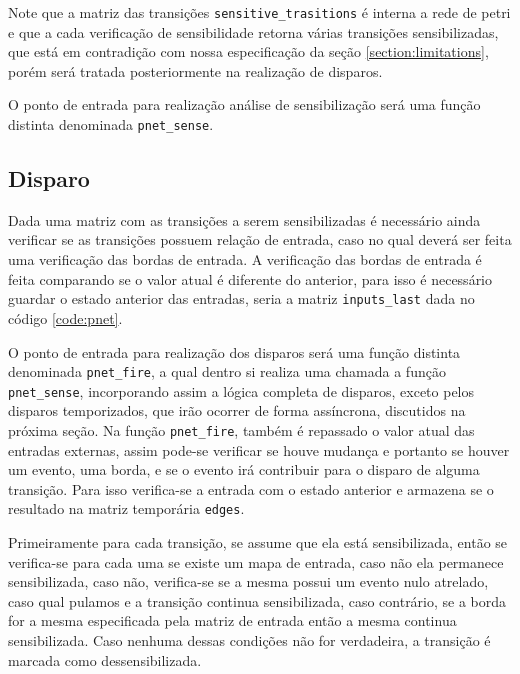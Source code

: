 Note que a matriz das transições \lstinline{sensitive_trasitions} é interna a rede de petri e que a cada verificação de sensibilidade retorna várias transições sensibilizadas, que está em contradição com nossa especificação da seção \ref{section:limitations}, porém será tratada posteriormente na realização de disparos.   

O ponto de entrada para realização análise de sensibilização será uma função distinta denominada \lstinline{pnet_sense}.

\subsection{Disparo}

Dada uma matriz com as transições a serem sensibilizadas é necessário ainda verificar se as transições possuem relação de entrada, caso no qual deverá ser feita uma verificação das bordas de entrada. A verificação das bordas de entrada é feita comparando se o valor atual é diferente do anterior, para isso é necessário guardar o estado anterior das entradas, seria a matriz \lstinline{inputs_last} dada no código \ref{code:pnet}.

O ponto de entrada para realização dos disparos será uma função distinta denominada \lstinline{pnet_fire}, a qual dentro si realiza uma chamada a função \lstinline{pnet_sense}, incorporando assim a lógica completa de disparos, exceto pelos disparos temporizados, que irão ocorrer de forma assíncrona, discutidos na próxima seção. Na função \lstinline{pnet_fire}, também é repassado o valor atual das entradas externas, assim pode-se verificar se houve mudança e portanto se houver um evento, uma borda, e se o evento irá contribuir para o disparo de alguma transição. Para isso verifica-se a entrada com o estado anterior e armazena se o resultado na matriz temporária \lstinline{edges}. 



Primeiramente para cada transição, se assume que ela está sensibilizada, então se verifica-se para cada uma se existe um mapa de entrada, caso não ela permanece sensibilizada, caso não, verifica-se se a mesma possui um evento nulo atrelado, caso qual pulamos e a transição continua sensibilizada, caso contrário, se a borda for a mesma especificada pela matriz de entrada então a mesma continua sensibilizada. Caso nenhuma dessas condições não for verdadeira, a transição é marcada como dessensibilizada.   

